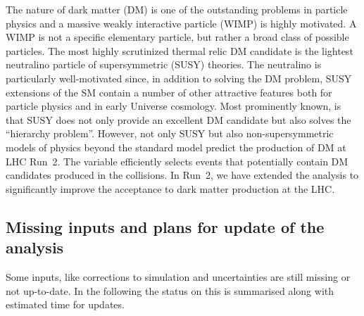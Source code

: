 The nature of dark matter (DM) is one of the outstanding problems in
particle physics and a massive weakly interactive particle (WIMP) is
highly motivated. A WIMP is not a specific elementary particle, but
rather a broad class of possible particles. The most highly
scrutinized thermal relic DM candidate is the lightest neutralino
particle of supersymmetric (SUSY) theories. The neutralino is
particularly well-motivated since, in addition to solving the DM
problem, SUSY extensions of the SM contain a number of other
attractive features both for particle physics and in early Universe
cosmology. Most prominently known, is that SUSY does not only provide
an excellent DM candidate but also solves the ``hierarchy problem''.
However, not only SUSY but also non-supersymmetric models of physics
beyond the standard model predict the production of DM at LHC Run~2.
The \alphat variable efficiently selects events that potentially
contain DM candidates produced in the collisions. In Run~2, we have extended
the \alphat analysis to significantly improve the acceptance to dark
matter production at the LHC. 



\subsection{Missing inputs and plans for update of the analysis}
\label{sec:inputs-and-updates}
Some inputs, like corrections to simulation and uncertainties are still missing or not up-to-date. 
In the following the status on this is summarised along with estimated time for updates.

